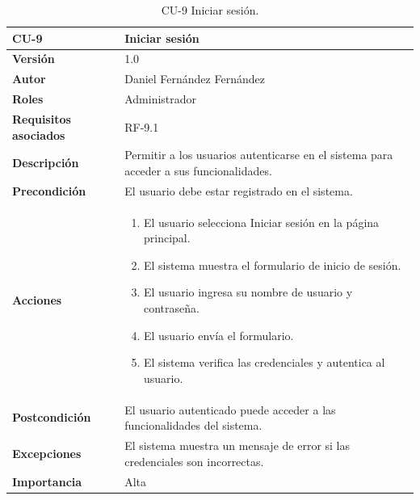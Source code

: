 \begin{table}[p]
        \centering
        \begin{tabularx}{\linewidth}{ p{} p{} }
            \toprule
            \textbf{CU-9} & \textbf{Iniciar sesión}\\
            \toprule
            \textbf{Versión} & 1.0 \\
            \textbf{Autor} & Daniel Fernández Fernández \\
            \textbf{Roles} & Administrador \\
            \textbf{Requisitos asociados} & RF-9.1 \\
            \textbf{Descripción} & Permitir a los usuarios autenticarse en el sistema para acceder a sus funcionalidades. \\
            \textbf{Precondición} & El usuario debe estar registrado en el sistema. \\
            \textbf{Acciones} &
            \begin{enumerate}
            \def\labelenumi{\arabic{enumi}.}
            \tightlist
            \item El usuario selecciona Iniciar sesión en la página principal.
            \item El sistema muestra el formulario de inicio de sesión.
            \item El usuario ingresa su nombre de usuario y contraseña.
            \item El usuario envía el formulario.
            \item El sistema verifica las credenciales y autentica al usuario.
            \end{enumerate}\\
            \textbf{Postcondición} & El usuario autenticado puede acceder a las funcionalidades del sistema. \\
            \textbf{Excepciones} & El sistema muestra un mensaje de error si las credenciales son incorrectas. \\
            \textbf{Importancia} & Alta \\
            \bottomrule
        \end{tabularx}
        \caption{CU-9 Iniciar sesión.}
\end{table}

